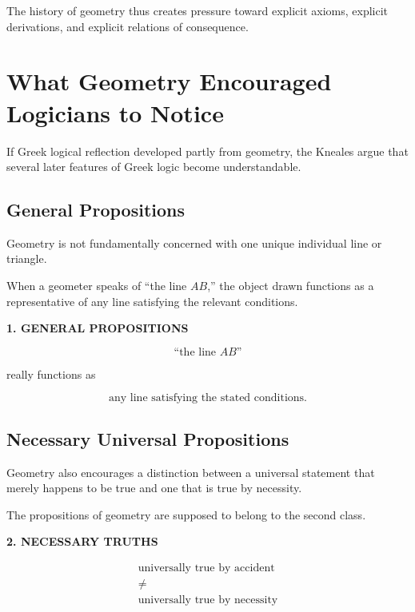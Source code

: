 \documentclass[11pt]{article}
\begin{document}
The history of geometry thus creates pressure toward explicit
axioms, explicit derivations, and explicit relations of
consequence.

\section{What Geometry Encouraged Logicians to Notice}

If Greek logical reflection developed partly from geometry, the
Kneales argue that several later features of Greek logic become
understandable.

\subsection{General Propositions}

Geometry is not fundamentally concerned with one unique
individual line or triangle.

When a geometer speaks of ``the line \(AB\),'' the object drawn
functions as a representative of any line satisfying the relevant
conditions.

\begin{whiteboard}
\textbf{1. GENERAL PROPOSITIONS}

\[
\text{``the line }AB\text{''}
\]

really functions as

\[
\text{any line satisfying the stated conditions.}
\]
\end{whiteboard}

\subsection{Necessary Universal Propositions}

Geometry also encourages a distinction between a universal
statement that merely happens to be true and one that is true by
necessity.

The propositions of geometry are supposed to belong to the
second class.

\begin{whiteboard}
\textbf{2. NECESSARY TRUTHS}

\[
\begin{array}{c}
\text{universally true by accident}\\
\neq\\
\text{universally true by necessity}
\end{array}
\]
\end{whiteboard}
\end{document}
